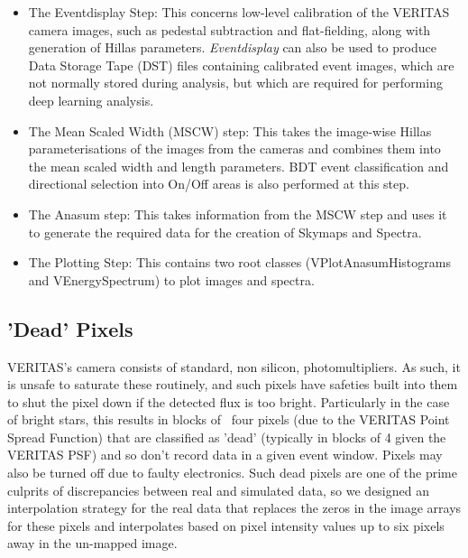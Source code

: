 \begin{itemize}
\item The Eventdisplay Step: This concerns low-level calibration of the VERITAS camera images, such as pedestal subtraction and flat-fielding, along with generation of Hillas parameters. \textit{Eventdisplay} can also be used to produce Data Storage Tape (DST) files containing calibrated event images, which are not normally stored during analysis, but which are required for performing deep learning analysis.

\item The Mean Scaled Width (MSCW) step: This takes the image-wise Hillas parameterisations of the images from the cameras and combines them into the mean scaled width and length parameters. BDT event classification and directional selection into On/Off areas is also performed at this step. 

\item The Anasum step: This takes information from the MSCW step and uses it to generate the required data for the creation of Skymaps and Spectra. 

\item The Plotting Step: This contains two root classes (VPlotAnasumHistograms and VEnergySpectrum) to plot images and spectra.

\end{itemize}

\subsection{'Dead' Pixels}
VERITAS's camera consists of standard, non silicon, photomultipliers. As such, it is unsafe to saturate these routinely, and such pixels have safeties built into them to shut the pixel down if the detected flux is too bright. Particularly in the case of bright stars, this results in blocks of ~four pixels (due to the VERITAS Point Spread Function) that are classified as 'dead' (typically in blocks of 4 given the VERITAS PSF) and so don't record data in a given event window. Pixels may also be turned off due to faulty electronics. Such dead pixels are one of the prime culprits of discrepancies between real and simulated data, so we designed an interpolation strategy for the real data that replaces the zeros in the image arrays for these pixels and interpolates based on pixel intensity values up to six pixels away in the un-mapped image.  


